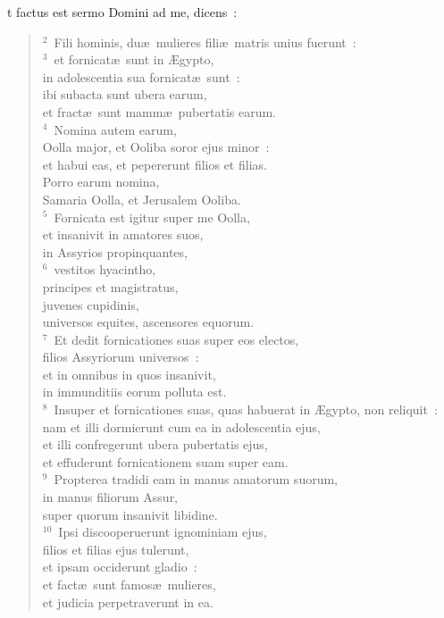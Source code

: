 \bchapter
{}t factus est sermo Domini ad me, dicens~:
\begin{flushleft}\begin{verse}\vspace{6pt}${}^{2}$~Fili hominis, du\ae\ mulieres fili\ae\ matris unius fuerunt~:\\
${}^{3}$~et fornicat\ae\ sunt in \AE gypto,\\ in adolescentia sua fornicat\ae\ sunt~:\\ ibi subacta sunt ubera earum,\\ et fract\ae\ sunt mamm\ae\ pubertatis earum.\\
${}^{4}$~Nomina autem earum,\\ Oolla major, et Ooliba soror ejus minor~:\\ et habui eas, et pepererunt filios et filias.\\ Porro earum nomina,\\ Samaria Oolla, et Jerusalem Ooliba.\\
${}^{5}$~Fornicata est igitur super me Oolla,\\ et insanivit in amatores suos,\\ in Assyrios propinquantes,\\
${}^{6}$~vestitos hyacintho,\\ principes et magistratus,\\ juvenes cupidinis,\\ universos equites, ascensores equorum.\\
${}^{7}$~Et dedit fornicationes suas super eos electos,\\ filios Assyriorum universos~:\\ et in omnibus in quos insanivit,\\ in immunditiis eorum polluta est.\\
${}^{8}$~Insuper et fornicationes suas, quas habuerat in \AE gypto, non reliquit~:\\ nam et illi dormierunt cum ea in adolescentia ejus,\\ et illi confregerunt ubera pubertatis ejus,\\ et effuderunt fornicationem suam super eam.\\
${}^{9}$~Propterea tradidi eam in manus amatorum suorum,\\ in manus filiorum Assur,\\ super quorum insanivit libidine.\\
${}^{10}$~Ipsi discooperuerunt ignominiam ejus,\\ filios et filias ejus tulerunt,\\ et ipsam occiderunt gladio~:\\ et fact\ae\ sunt famos\ae\ mulieres,\\ et judicia perpetraverunt in ea.\\

\end{verse}
\end{flushleft}
